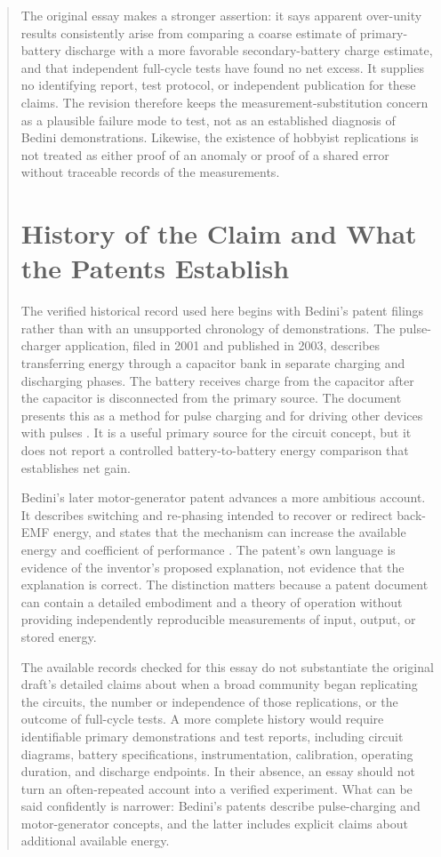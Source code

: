 \documentclass[11pt]{article}
\begin{document}
\begin{abstract}
The original essay makes a stronger assertion: it says apparent over-unity results consistently arise from comparing a coarse estimate of primary-battery discharge with a more favorable secondary-battery charge estimate, and that independent full-cycle tests have found no net excess. It supplies no identifying report, test protocol, or independent publication for these claims. The revision therefore keeps the measurement-substitution concern as a plausible failure mode to test, not as an established diagnosis of Bedini demonstrations. Likewise, the existence of hobbyist replications is not treated as either proof of an anomaly or proof of a shared error without traceable records of the measurements.

\section{History of the Claim and What the Patents Establish}

The verified historical record used here begins with Bedini's patent filings rather than with an unsupported chronology of demonstrations. The pulse-charger application, filed in 2001 and published in 2003, describes transferring energy through a capacitor bank in separate charging and discharging phases. The battery receives charge from the capacitor after the capacitor is disconnected from the primary source. The document presents this as a method for pulse charging and for driving other devices with pulses \cite{Bedini2003}. It is a useful primary source for the circuit concept, but it does not report a controlled battery-to-battery energy comparison that establishes net gain.

Bedini's later motor-generator patent advances a more ambitious account. It describes switching and re-phasing intended to recover or redirect back-EMF energy, and states that the mechanism can increase the available energy and coefficient of performance \cite{Bedini2006}. The patent's own language is evidence of the inventor's proposed explanation, not evidence that the explanation is correct. The distinction matters because a patent document can contain a detailed embodiment and a theory of operation without providing independently reproducible measurements of input, output, or stored energy.

The available records checked for this essay do not substantiate the original draft's detailed claims about when a broad community began replicating the circuits, the number or independence of those replications, or the outcome of full-cycle tests. A more complete history would require identifiable primary demonstrations and test reports, including circuit diagrams, battery specifications, instrumentation, calibration, operating duration, and discharge endpoints. In their absence, an essay should not turn an often-repeated account into a verified experiment. What can be said confidently is narrower: Bedini's patents describe pulse-charging and motor-generator concepts, and the latter includes explicit claims about additional available energy.


\end{abstract}
\end{document}
